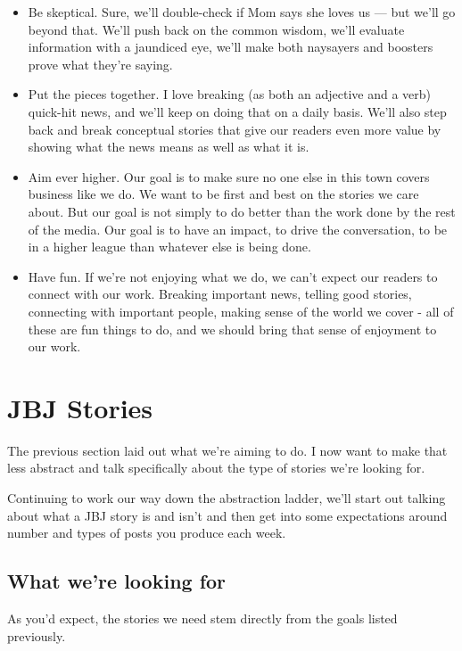 \documentclass[
  11pt,
  american,
  letterpaperpaper,
  extrafontsizes,onecolumn,openright
  ]{memoir}
\begin{document}
\begin{itemize}
\item
  Be skeptical. Sure, we'll double-check if Mom says she loves us --- but we'll go beyond that. We'll push back on the common wisdom, we'll evaluate information with a jaundiced eye, we'll make both naysayers and boosters prove what they're saying.
\item
  Put the pieces together. I love breaking (as both an adjective and a verb) quick-hit news, and we'll keep on doing that on a daily basis. We'll also step back and break conceptual stories that give our readers even more value by showing what the news means as well as what it is.
\item
  Aim ever higher. Our goal is to make sure no one else in this town covers business like we do. We want to be first and best on the stories we care about. But our goal is not simply to do better than the work done by the rest of the media. Our goal is to have an impact, to drive the conversation, to be in a higher league than whatever else is being done.
\item
  Have fun. If we're not enjoying what we do, we can't expect our readers to connect with our work. Breaking important news, telling good stories, connecting with important people, making sense of the world we cover - all of these are fun things to do, and we should bring that sense of enjoyment to our work.
\end{itemize}

\hypertarget{jbj-stories}{%
\chapter{JBJ Stories}\label{jbj-stories}}

The previous section laid out what we're aiming to do. I now want to make that less abstract and talk specifically about the type of stories we're looking for.

Continuing to work our way down the abstraction ladder, we'll start out talking about what a JBJ story is and isn't and then get into some expectations around number and types of posts you produce each week.

\hypertarget{what-were-looking-for}{%
\section*{What we're looking for}\label{what-were-looking-for}}

As you'd expect, the stories we need stem directly from the goals listed previously.
\end{document}

